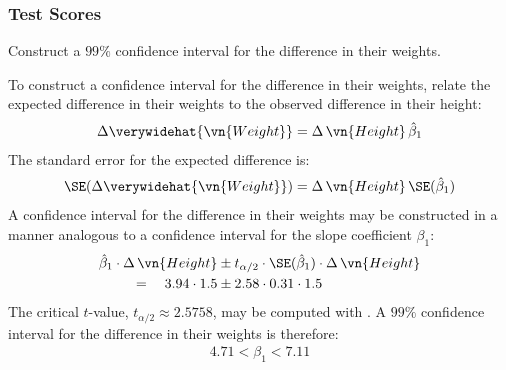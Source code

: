 \begin{frame}
\frametitle{Test Scores}

Construct a $99\%$ confidence interval for the difference in their weights.

\begin{answer}
To construct a confidence interval for the difference in their weights, relate the expected difference in their weights to the observed difference in their height:
\begin{align*}
\Delta\verywidehat{\vn{Weight}} 
  = \Delta\,\vn{Height}\,\hat{\beta}_{1}
\end{align*}
The standard error for the expected difference is:
\begin{align*}
\SE(\Delta\verywidehat{\vn{Weight}})
  = \Delta\,\vn{Height}\, \SE(\hat{\beta}_{1})
\end{align*}
A confidence interval for the difference in their weights may be constructed in a manner analogous to a confidence interval for the slope coefficient $\beta_{1}$:
\begin{align*}
\hat{\beta}_{1} \cdot \Delta\,\vn{Height} 
    & \pm t_{\alpha/2} \cdot \SE(\hat{\beta}_{1}) \cdot \Delta\,\vn{Height} \\
    = \quad 3.94 \cdot 1.5 
    & \pm 2.58 \cdot 0.31 \cdot 1.5 
\end{align*}
The critical $t$-value, $t_{\alpha/2}\approx2.5758$, may be computed with .
A $99\%$ confidence interval for the difference in their weights is therefore:
\begin{align*}
4.71 < \beta_{1} < 7.11
\end{align*}
\end{answer}

\end{frame}



